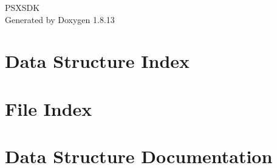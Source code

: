 \documentclass[twoside]{book}
\newcommand{\+}{\discretionary{\mbox{\scriptsize$\hookleftarrow$}}{}{}}
\newcommand{\clearemptydoublepage}{%
  \newpage{\pagestyle{empty}\cleardoublepage}%
}
\begin{document}
\hypersetup{pageanchor=false,
             bookmarksnumbered=true,
             pdfencoding=unicode
            }
\begin{titlepage}
\vspace*{7cm}
\begin{center}%
{\Large P\+S\+X\+S\+DK }\\
\vspace*{1cm}
{\large Generated by Doxygen 1.8.13}\\
\end{center}
\end{titlepage}
\clearemptydoublepage
{}
\tableofcontents
\clearemptydoublepage
{}
\hypersetup{pageanchor=true}

\chapter{Data Structure Index}

\chapter{File Index}

\chapter{Data Structure Documentation}











































\end{document}
